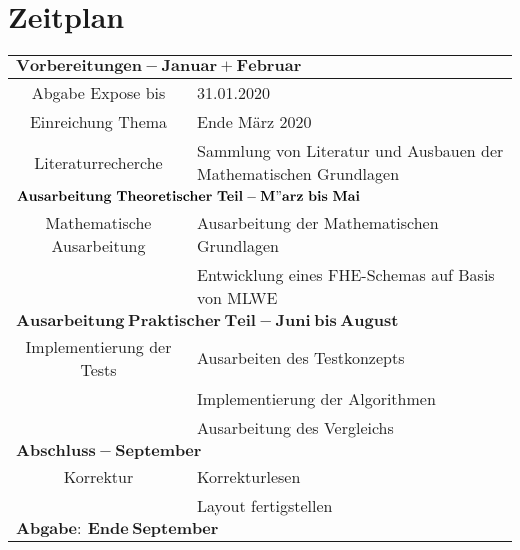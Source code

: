 \chapter{Zeitplan}
\label{Zeitplan}

\begin{tabular}{|c | p{10cm} |}
  \toprule
  \multicolumn{2}{|l|}{$\mathbf{Vorbereitungen - Januar+Februar}$}                               \\
  \midrule
  Abgabe Expose bis          & 31.01.2020                                                        \\
  Einreichung Thema          & Ende März 2020                                                   \\
  Literaturrecherche         & Sammlung von Literatur und Ausbauen der Mathematischen Grundlagen \\
  \midrule
  \multicolumn{2}{|l|}{$\mathbf{Ausarbeitung~Theoretischer~Teil - M"arz~bis~Mai}$}                \\
  \midrule
  Mathematische Ausarbeitung & Ausarbeitung der Mathematischen Grundlagen                        \\
                             & Entwicklung eines FHE-Schemas auf Basis von MLWE                  \\
  \midrule
  \multicolumn{2}{|l|}{$\mathbf{Ausarbeitung~Praktischer~Teil - Juni~bis~August}$}               \\
  \midrule
  Implementierung der Tests  & Ausarbeiten des Testkonzepts                                      \\
                             & Implementierung der Algorithmen                                   \\
                             & Ausarbeitung des Vergleichs                                       \\
  \midrule
  \multicolumn{2}{|l|}{$\mathbf{Abschluss - September}$}                                         \\
  \midrule
  Korrektur                  & Korrekturlesen                                                    \\
                             & Layout fertigstellen                                              \\
  \midrule
  \multicolumn{2}{|l|}{$\mathbf{Abgabe:~Ende~September}$}                                         \\
  \bottomrule                                                    
\end{tabular}